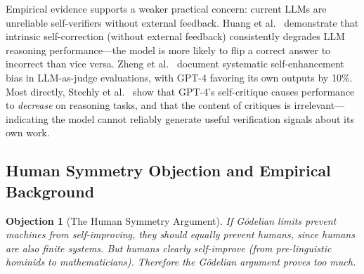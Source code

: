 \documentclass[11pt,a4paper]{article}
\newtheorem{objection}{Objection}
\begin{document}
Empirical evidence supports a weaker practical concern: current LLMs are unreliable self-verifiers without external feedback. Huang et al.~\cite{huang2023selfcorrect} demonstrate that intrinsic self-correction (without external feedback) consistently degrades LLM reasoning performance---the model is more likely to flip a correct answer to incorrect than vice versa. Zheng et al.~\cite{zheng2023judge} document systematic self-enhancement bias in LLM-as-judge evaluations, with GPT-4 favoring its own outputs by 10\%. Most directly, Stechly et al.~\cite{stechly2024verification} show that GPT-4's self-critique causes performance to \emph{decrease} on reasoning tasks, and that the content of critiques is irrelevant---indicating the model cannot reliably generate useful verification signals about its own work.

\subsection{Human Symmetry Objection and Empirical Background}

\begin{objection}[The Human Symmetry Argument]
If G\"{o}delian limits prevent machines from self-improving, they should equally prevent humans, since humans are also finite systems. But humans clearly self-improve (from pre-linguistic hominids to mathematicians). Therefore the G\"{o}delian argument proves too much.
\end{objection}
\end{document}
